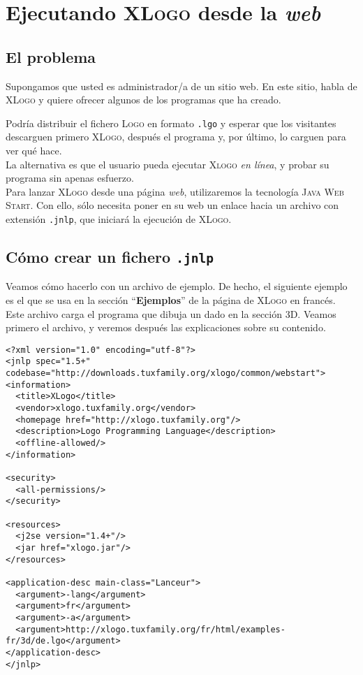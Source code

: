 \chapter{Ejecutando \textsc{XLogo} desde la \textit{web}}

\section{El problema}

Supongamos que usted es administrador/a de un sitio web. En este sitio, habla de
\textsc{XLogo} y quiere ofrecer algunos de los programas que ha creado.

Podr\'ia distribuir el fichero \textsc{Logo} en formato \texttt{.lgo} y esperar
que los visitantes descarguen primero \textsc{XLogo}, despu\'es el programa y, por
\'ultimo, lo carguen para ver qu\'e hace. \\

\noindent La alternativa es que el usuario pueda ejecutar \textsc{Xlogo} 
\textit{en l\'inea}, y probar su programa sin apenas esfuerzo. \\

\noindent Para lanzar \textsc{XLogo} desde una p\'agina \textit{web}, utilizaremos
la tecnolog\'ia \textsc{Java Web Start}. Con ello, s\'olo necesita poner en su
web un enlace hacia un archivo con extensi\'on \texttt{.jnlp}, que iniciar\'a la
ejecuci\'on de \textsc{XLogo}.

\section{C\'omo crear un fichero \texttt{.jnlp}}

Veamos c\'omo hacerlo con un archivo de ejemplo. De hecho, el siguiente ejemplo es
el que se usa en la secci\'on ``\textbf{Ejemplos}'' de la p\'agina de \textsc{XLogo} 
en franc\'es. \\

\noindent Este archivo carga el programa que dibuja un dado en la secci\'on 3D.
Veamos primero el archivo, y veremos despu\'es las explicaciones sobre su contenido.

\begin{verbatim}
<?xml version="1.0" encoding="utf-8"?>
<jnlp spec="1.5+" codebase="http://downloads.tuxfamily.org/xlogo/common/webstart">
<information>
  <title>XLogo</title>
  <vendor>xlogo.tuxfamily.org</vendor>
  <homepage href="http://xlogo.tuxfamily.org"/>
  <description>Logo Programming Language</description>
  <offline-allowed/>
</information>

<security>
  <all-permissions/>
</security>

<resources>
  <j2se version="1.4+"/>
  <jar href="xlogo.jar"/>
</resources>

<application-desc main-class="Lanceur">
  <argument>-lang</argument>
  <argument>fr</argument>
  <argument>-a</argument>
  <argument>http://xlogo.tuxfamily.org/fr/html/examples-fr/3d/de.lgo</argument>
</application-desc>
</jnlp>
\end{verbatim}

